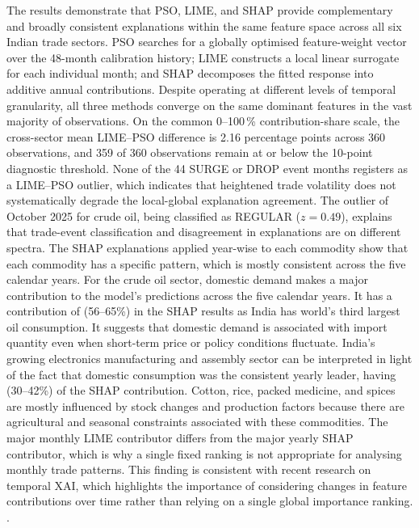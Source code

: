 \documentclass[pdftex,sn-mathphys-num]{sn-jnl}
\begin{document}
The results demonstrate that PSO, LIME, and SHAP provide complementary and broadly consistent explanations within the same feature space across all six Indian trade sectors. PSO searches for a globally optimised feature-weight vector over the 48-month calibration history; LIME constructs a local linear surrogate for each individual month; and SHAP decomposes the fitted response into additive annual contributions. Despite operating at different levels of temporal granularity, all three methods converge on the same dominant features in the vast majority of observations. On the common 0--100\,\% contribution-share scale, the cross-sector mean LIME--PSO difference is 2.16 percentage points across 360 observations, and 359 of 360 observations remain at or below the 10-point diagnostic threshold. None of the 44 SURGE or DROP event months registers as a LIME--PSO outlier, which indicates that heightened trade volatility does not systematically degrade the local-global explanation agreement. The outlier of October 2025 for crude oil, being classified as REGULAR ($z = 0.49$), explains that trade-event classification and disagreement in explanations are on different spectra. The SHAP explanations applied year-wise to each commodity show that each commodity has a specific pattern, which is mostly consistent across the five calendar years. For the crude oil sector, domestic demand makes a major contribution to the model's predictions across the five calendar years. It has a contribution of (56--65\%) in the SHAP results as India has world's third largest oil consumption. It suggests that domestic demand is associated with import quantity even when short-term price or policy conditions fluctuate. India's growing electronics manufacturing and assembly sector can be interpreted in light of the fact that domestic consumption was the consistent yearly leader, having (30--42\%) of the SHAP contribution. Cotton, rice, packed medicine, and spices are mostly influenced by stock changes and production factors because there are agricultural and seasonal constraints associated with these commodities. The major monthly LIME contributor differs from the major yearly SHAP contributor, which is why a single fixed ranking is not appropriate for analysing monthly trade patterns. This finding is consistent with recent research on temporal XAI, which highlights the importance of considering changes in feature contributions over time rather than relying on a single global importance ranking. \cite{canti2024,vanzy2024,hertel2026}.
\end{document}
